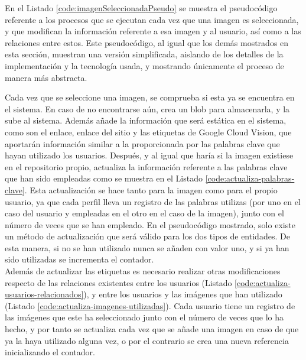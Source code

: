 En el Listado \ref{code:imagenSeleccionadaPseudo} se muestra el pseudocódigo referente a los procesos que se ejecutan cada vez que una imagen es seleccionada, y que modifican la información referente a esa imagen y al usuario, así como a las relaciones entre estos. Este pseudocódigo, al igual que los demás mostrados en esta sección, muestran una versión simplificada, aislando de los detalles de la implementación y la tecnología usada, y mostrando únicamente el proceso de manera más abstracta.

Cada vez que se seleccione una imagen, se comprueba si esta ya se encuentra en el sistema. En caso de no encontrarse aún, crea un blob para almacenarla, y la sube al sistema. Además añade la información que será estática en el sistema, como son el enlace, enlace del sitio y las etiquetas de Google Cloud Vision, que aportarán información similar a la proporcionada por las palabras clave que hayan utilizado los usuarios. Después, y al igual que haría si la imagen existiese en el repositorio propio, actualiza la información referente a las palabras clave que han sido empleadas como se muestra en el Listado \ref{code:actualiza-palabras-clave}. Esta actualización se hace tanto para la imagen como para el propio usuario, ya que cada perfil lleva un registro de las palabras utilizas (por uno en el caso del usuario y empleadas en el otro en el caso de la imagen), junto con el número de veces que se han empleado. En el pseudocódigo mostrado, solo existe un método de actualización que será válido para los dos tipos de entidades. De esta manera, si no se han utilizado nunca se añaden con valor uno, y si ya han sido utilizadas se incrementa el contador.\\






Además de actualizar las etiquetas es necesario realizar otras modificaciones respecto de las relaciones existentes entre los usuarios (Listado \ref{code:actualiza-usuarios-relacionados}), y entre los usuarios y las imágenes que han utilizado (Listado \ref{code:actualiza-imagenes-utilizadas}). Cada usuario tiene un registro de las imágenes que este ha seleccionado junto con el número de veces que lo ha hecho, y por tanto se actualiza cada vez que se añade una imagen en caso de que ya la haya utilizado alguna vez, o por el contrario se crea una nueva referencia inicializando el contador.

